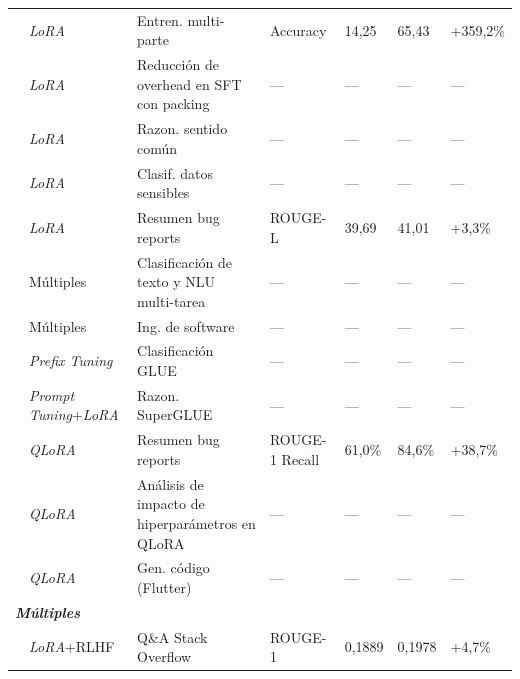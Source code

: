 \begin{longtable}{p{3.5cm} p{1.7cm} p{3.0cm} p{1.8cm} p{1.3cm} p{1.3cm} p{0.9cm}}
\scriptsize\autocite{liu2025mpctf} & \scriptsize\textit{LoRA} & \scriptsize Entren. multi-parte & \scriptsize Accuracy & \scriptsize 14,25 & \scriptsize 65,43 & \scriptsize +359,2\% \\
\scriptsize\autocite{seo2025lora} & \scriptsize\textit{LoRA} & \scriptsize Reducción de overhead en SFT con packing & \scriptsize --- & \scriptsize --- & \scriptsize --- & \scriptsize --- \\
\scriptsize\autocite{wang2025ft} & \scriptsize\textit{LoRA} & \scriptsize Razon. sentido común & \scriptsize --- & \scriptsize --- & \scriptsize --- & \scriptsize --- \\
\scriptsize\autocite{wu2024federated} & \scriptsize\textit{LoRA} & \scriptsize Clasif. datos sensibles & \scriptsize --- & \scriptsize --- & \scriptsize --- & \scriptsize --- \\
\scriptsize\autocite{xiang2024sumllama} & \scriptsize\textit{LoRA} & \scriptsize Resumen bug reports & \scriptsize ROUGE-L & \scriptsize 39,69 & \scriptsize 41,01 & \scriptsize +3,3\% \\
\scriptsize\autocite{prottasha2024peft} & \scriptsize Múltiples & \scriptsize Clasificación de texto y NLU multi-tarea & \scriptsize --- & \scriptsize --- & \scriptsize --- & \scriptsize --- \\
\scriptsize\autocite{zou2025peft} & \scriptsize Múltiples & \scriptsize Ing. de software & \scriptsize --- & \scriptsize --- & \scriptsize --- & \scriptsize --- \\
\scriptsize\autocite{jung2025prefix} & \scriptsize\textit{Prefix Tuning} & \scriptsize Clasificación GLUE & \scriptsize --- & \scriptsize --- & \scriptsize --- & \scriptsize --- \\
\scriptsize\autocite{liu2025tasks} & \scriptsize\textit{Prompt Tuning}+\textit{LoRA} & \scriptsize Razon. SuperGLUE & \scriptsize --- & \scriptsize --- & \scriptsize --- & \scriptsize --- \\
\scriptsize\autocite{choi2025agentreport} & \scriptsize\textit{QLoRA} & \scriptsize Resumen bug reports & \scriptsize ROUGE-1 Recall & \scriptsize 61,0\% & \scriptsize 84,6\% & \scriptsize +38,7\% \\
\scriptsize\autocite{shen2025quant} & \scriptsize\textit{QLoRA} & \scriptsize Análisis de impacto de hiperparámetros en QLoRA & \scriptsize --- & \scriptsize --- & \scriptsize --- & \scriptsize --- \\
\scriptsize\autocite{ulurmak2025ft} & \scriptsize\textit{QLoRA} & \scriptsize Gen. código (Flutter) & \scriptsize --- & \scriptsize --- & \scriptsize --- & \scriptsize --- \\
\multicolumn{7}{l}{\scriptsize\textbf{\textit{Múltiples}}} \\[2pt]
\scriptsize\autocite{gorbatovski2024qa} & \scriptsize\textit{LoRA}+RLHF & \scriptsize Q\&A Stack Overflow & \scriptsize ROUGE-1 & \scriptsize 0,1889 & \scriptsize 0,1978 & \scriptsize +4,7\% \\
\end{longtable}

